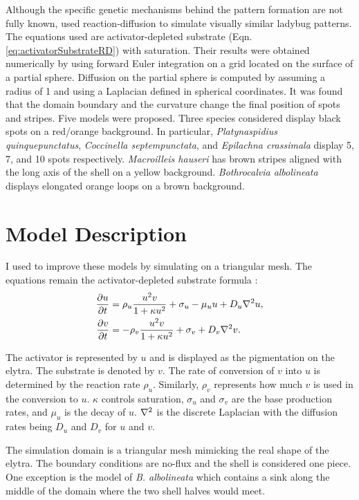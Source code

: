 Although the specific genetic mechanisms behind the pattern formation are not fully known, \citet{liaw2001} used reaction-diffusion to simulate visually similar ladybug patterns. The equations used are activator-depleted substrate (Eqn. \ref{eq:activatorSubstrateRD}) with saturation. Their results were obtained numerically by using forward Euler integration on a grid located on the surface of a partial sphere. Diffusion on the partial sphere is computed by assuming a radius of 1 and using a Laplacian defined in spherical coordinates. It was found that the domain boundary and the curvature change the final position of spots and stripes. Five models were proposed. Three species considered display black spots on a red/orange background. In particular, \textit{Platynaspidius quinquepunctatus}, \textit{Coccinella septempunctata}, and \textit{Epilachna crassimala} display 5, 7, and 10 spots respectively. \textit{Macroilleis hauseri} has brown stripes aligned with the long axis of the shell on a yellow background. \textit{Bothrocalvia albolineata} displays elongated orange loops on a brown background.

\section{Model Description} 
I used \ProgramName{} to improve these models by simulating on a triangular mesh. The equations remain the activator-depleted substrate formula \citep{meinhardt1982}:
\begin{equation}
	\begin{aligned} \label{eq:ladybugRD}
   \frac{\partial u}{\partial t} &= \rho_u \frac{u^2v}{1+\kappa u^2} + \sigma_u - \mu_u u + D_u \nabla^2 u, \\
   \frac{\partial v}{\partial t} &= -\rho_v \frac{u^2v}{1+\kappa u^2} + \sigma_v + D_v \nabla^2 v.
	\end{aligned}
\end{equation}

The activator is represented by $u$ and is displayed as the pigmentation on the elytra. The substrate is denoted by $v$. The rate of conversion of $v$ into $u$ is determined by the reaction rate $\rho_u$. Similarly, $\rho_v$ represents how much $v$ is used in the conversion to $u$. $\kappa$ controls saturation, $\sigma_u$ and $\sigma_v$ are the base production rates, and $\mu_u$ is the decay of $u$. $\nabla^2$ is the discrete Laplacian with the diffusion rates being $D_u$ and $D_v$ for $u$ and $v$.

The simulation domain is a triangular mesh mimicking the real shape of the elytra. The boundary conditions are no-flux and the shell is considered one piece. One exception is the model of  \textit{B. albolineata} which contains a sink along the middle of the domain where the two shell halves would meet. 


